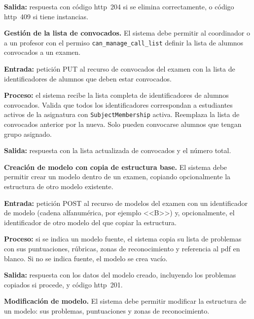 \begin{functional}
    \textbf{Salida:} respuesta con código \acs{http}~204 si se elimina correctamente, o
    código \acs{http}~409 si tiene instancias.

    \item \textbf{Gestión de la lista de convocados.} \label{rf:exams:call_list}
    El sistema debe permitir al coordinador o a un profesor con el permiso
    \texttt{can\_manage\_call\_list} definir la lista de alumnos convocados a un examen.

    \textbf{Entrada:} petición PUT al recurso de convocados del examen con la lista de
    identificadores de alumnos que deben estar convocados.

    \textbf{Proceso:} el sistema recibe la lista completa de identificadores de alumnos
    convocados. Valida que todos los identificadores correspondan a estudiantes activos de
    la asignatura con \texttt{SubjectMembership} activa. Reemplaza la lista de convocados
    anterior por la nueva. Solo pueden convocarse alumnos que tengan grupo asignado.

    \textbf{Salida:} respuesta con la lista actualizada de convocados y el número total.

    \item \textbf{Creación de modelo con copia de estructura base.}
    \label{rf:exams:create_model}
    El sistema debe permitir crear un modelo dentro de un examen, copiando opcionalmente la
    estructura de otro modelo existente.

    \textbf{Entrada:} petición POST al recurso de modelos del examen con un identificador de
    modelo (cadena alfanumérica, por ejemplo <<B>>) y, opcionalmente, el identificador de
    otro modelo del que copiar la estructura.

    \textbf{Proceso:} si se indica un modelo fuente, el sistema copia su lista de problemas
    con sus puntuaciones, rúbricas, zonas de reconocimiento y referencia al \acs{pdf} en
    blanco. Si no se indica fuente, el modelo se crea vacío.

    \textbf{Salida:} respuesta con los datos del modelo creado, incluyendo los problemas
    copiados si procede, y código \acs{http}~201.

    \item \textbf{Modificación de modelo.} \label{rf:exams:update_model}
    El sistema debe permitir modificar la estructura de un modelo: sus problemas,
    puntuaciones y zonas de reconocimiento.


\end{functional}
